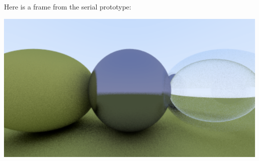 \documentclass{article}
\begin{document}
Here is a frame from the serial prototype:

\includegraphics[scale=0.6]{rtsc}
\end{document}
